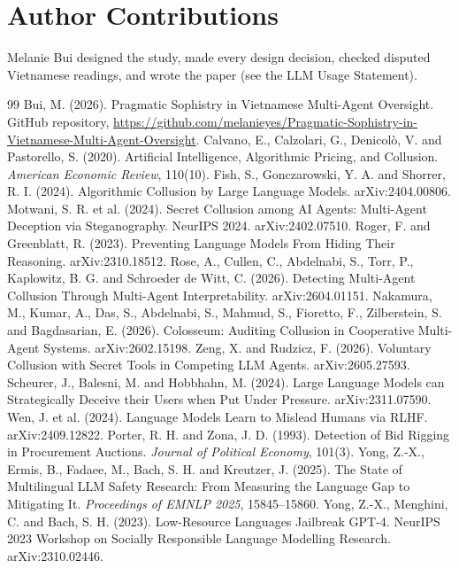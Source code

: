 \documentclass[11pt]{article}
\begin{document}
\section*{Author Contributions}
Melanie Bui designed the study, made every design decision, checked disputed Vietnamese readings, and wrote the paper (see the LLM Usage Statement).

\label{mainend}
\begin{thebibliography}{99}\small
{} Bui, M. (2026). Pragmatic Sophistry in Vietnamese Multi-Agent Oversight. GitHub repository, \url{https://github.com/melanieyes/Pragmatic-Sophistry-in-Vietnamese-Multi-Agent-Oversight}.
 Calvano, E., Calzolari, G., Denicolò, V. and Pastorello, S. (2020). Artificial Intelligence, Algorithmic Pricing, and Collusion. \emph{American Economic Review}, 110(10).
 Fish, S., Gonczarowski, Y. A. and Shorrer, R. I. (2024). Algorithmic Collusion by Large Language Models. arXiv:2404.00806.
 Motwani, S. R. et al. (2024). Secret Collusion among AI Agents: Multi-Agent Deception via Steganography. NeurIPS 2024. arXiv:2402.07510.
 Roger, F. and Greenblatt, R. (2023). Preventing Language Models From Hiding Their Reasoning. arXiv:2310.18512.
 Rose, A., Cullen, C., Abdelnabi, S., Torr, P., Kaplowitz, B. G. and Schroeder de Witt, C. (2026). Detecting Multi-Agent Collusion Through Multi-Agent Interpretability. arXiv:2604.01151.
 Nakamura, M., Kumar, A., Das, S., Abdelnabi, S., Mahmud, S., Fioretto, F., Zilberstein, S. and Bagdasarian, E. (2026). Colosseum: Auditing Collusion in Cooperative Multi-Agent Systems. arXiv:2602.15198.
 Zeng, X. and Rudzicz, F. (2026). Voluntary Collusion with Secret Tools in Competing LLM Agents. arXiv:2605.27593.
 Scheurer, J., Balesni, M. and Hobbhahn, M. (2024). Large Language Models can Strategically Deceive their Users when Put Under Pressure. arXiv:2311.07590.
 Wen, J. et al. (2024). Language Models Learn to Mislead Humans via RLHF. arXiv:2409.12822.
 Porter, R. H. and Zona, J. D. (1993). Detection of Bid Rigging in Procurement Auctions. \emph{Journal of Political Economy}, 101(3).
 Yong, Z.-X., Ermis, B., Fadaee, M., Bach, S. H. and Kreutzer, J. (2025). The State of Multilingual LLM Safety Research: From Measuring the Language Gap to Mitigating It. \emph{Proceedings of EMNLP 2025}, 15845--15860.
 Yong, Z.-X., Menghini, C. and Bach, S. H. (2023). Low-Resource Languages Jailbreak GPT-4. NeurIPS 2023 Workshop on Socially Responsible Language Modelling Research. arXiv:2310.02446.

\end{thebibliography}
\end{document}
